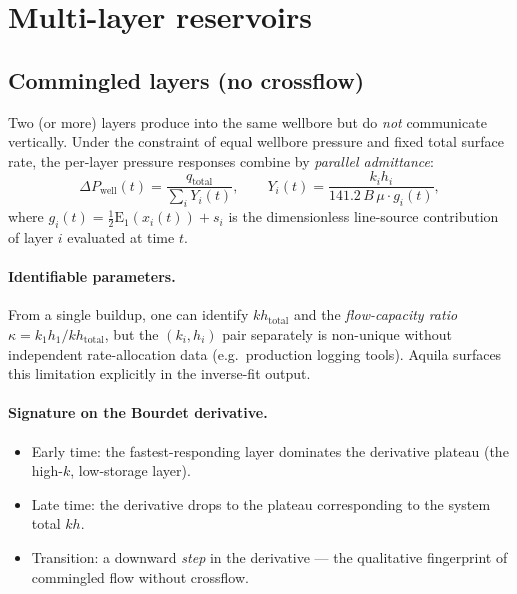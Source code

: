 \documentclass[11pt,a4paper]{article}
\newcommand{\Ein}{\mathrm{E}_1}
\newcommand{\kh}{kh}
\begin{document}
\section{Multi-layer reservoirs}
\label{sec:layered}

\subsection{Commingled layers (no crossflow)}

Two (or more) layers produce into the same wellbore but do \emph{not}
communicate vertically. Under the constraint of equal wellbore pressure
and fixed total surface rate, the per-layer pressure responses combine
by \emph{parallel admittance}:
\begin{equation}
    \Delta P_\text{well}(t) =
    \frac{q_\text{total}}{\sum_i Y_i(t)},
    \qquad
    Y_i(t) = \frac{k_i h_i}{141.2\,B\,\mu \cdot g_i(t)},
\end{equation}
where $g_i(t) = \tfrac{1}{2}\Ein(x_i(t)) + s_i$ is the dimensionless
line-source contribution of layer $i$ evaluated at time $t$.

\paragraph{Identifiable parameters.}
From a single buildup, one can identify $\kh_\text{total}$ and the
\emph{flow-capacity ratio}
$\kappa = k_1 h_1 / \kh_\text{total}$, but the $(k_i, h_i)$ pair
separately is non-unique without independent rate-allocation data (e.g.\
production logging tools). Aquila surfaces this limitation explicitly in
the inverse-fit output.

\paragraph{Signature on the Bourdet derivative.}
\begin{itemize}[noitemsep]
    \item Early time: the fastest-responding layer dominates the
          derivative plateau (the high-$k$, low-storage layer).
    \item Late time: the derivative drops to the plateau corresponding
          to the system total $\kh$.
    \item Transition: a downward \emph{step} in the derivative — the
          qualitative fingerprint of commingled flow without crossflow.
\end{itemize}
\end{document}
